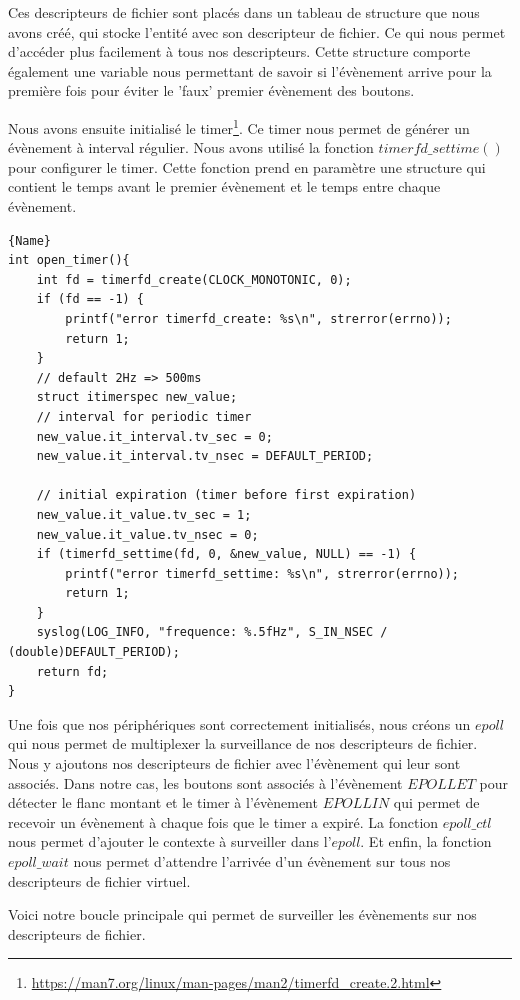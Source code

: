 \documentclass[
	a4paper, %
	10pt, %
]{CSUniSchoolLabReport}
\begin{document}
Ces descripteurs de fichier sont placés dans un tableau de structure que nous avons créé, qui stocke l'entité avec son descripteur de fichier. Ce qui nous permet d'accéder plus facilement à tous nos descripteurs. Cette structure comporte également une variable nous permettant de savoir si l'évènement arrive pour la première fois pour éviter le 'faux' premier évènement des boutons.

Nous avons ensuite initialisé le timer\footnote{\href{https://man7.org/linux/man-pages/man2/timerfd_create.2.html}{https://man7.org/linux/man-pages/man2/timerfd\_create.2.html}}. 
Ce timer nous permet de générer un évènement à interval régulier. Nous avons utilisé la fonction $timerfd\_settime()$ pour configurer le timer. Cette fonction prend en paramètre une structure qui contient le temps avant le premier évènement et le temps entre chaque évènement.
\begin{lstlisting}[style=CStyle, caption=Initialisation du timer, firstnumber=1]{Name}
int open_timer(){
	int fd = timerfd_create(CLOCK_MONOTONIC, 0);
    if (fd == -1) {
        printf("error timerfd_create: %s\n", strerror(errno));
        return 1;
    }
    // default 2Hz => 500ms
    struct itimerspec new_value;
    // interval for periodic timer
    new_value.it_interval.tv_sec = 0;
    new_value.it_interval.tv_nsec = DEFAULT_PERIOD; 

    // initial expiration (timer before first expiration)
    new_value.it_value.tv_sec = 1;
    new_value.it_value.tv_nsec = 0;
    if (timerfd_settime(fd, 0, &new_value, NULL) == -1) {
        printf("error timerfd_settime: %s\n", strerror(errno));
        return 1;
    }
    syslog(LOG_INFO, "frequence: %.5fHz", S_IN_NSEC / (double)DEFAULT_PERIOD);
    return fd;
}
\end{lstlisting}

Une fois que nos périphériques sont correctement initialisés, nous créons un $epoll$ qui nous permet de multiplexer la surveillance de nos descripteurs de fichier. Nous y ajoutons nos descripteurs de fichier avec l'évènement qui leur sont associés. Dans notre cas, les boutons sont associés à l'évènement $EPOLLET$ pour détecter le flanc montant et le timer à l'évènement $EPOLLIN$ qui permet de recevoir un évènement à chaque fois que le timer a expiré. La fonction $epoll\_ctl$ nous permet d'ajouter le contexte à surveiller dans l'$epoll$. Et enfin, la fonction $epoll\_wait$ nous permet d'attendre l'arrivée d'un évènement sur tous nos descripteurs de fichier virtuel.

Voici notre boucle principale qui permet de surveiller les évènements sur nos descripteurs de fichier.
\end{document}
